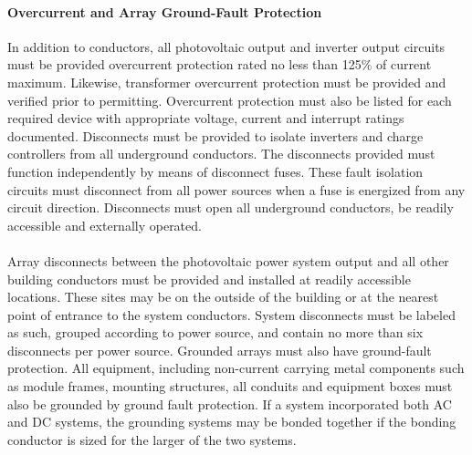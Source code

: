 \paragraph{Overcurrent and Array Ground-Fault Protection}
In addition to conductors, all photovoltaic output and inverter output circuits must be provided overcurrent protection rated no less than 125\% of current maximum. Likewise, transformer overcurrent protection must be provided and verified prior to permitting. Overcurrent protection must also be listed for each required device with appropriate voltage, current and interrupt ratings documented. Disconnects must be provided to isolate inverters and charge controllers from all underground conductors. The disconnects provided must function independently by means of disconnect fuses. These fault isolation circuits must disconnect from all power sources when a fuse is energized from any circuit direction. Disconnects must open all underground conductors, be readily accessible and externally operated.
\\\\
\noindent  Array disconnects between the photovoltaic power system output and all other building conductors must be provided and installed at readily accessible locations. These sites may be on the outside of the building or at the nearest point of entrance to the system conductors. System disconnects must be labeled as such, grouped according to power source, and contain no more than six disconnects per power source. Grounded arrays must also have ground-fault protection. All equipment, including non-current carrying metal components such as module frames, mounting structures, all conduits and equipment boxes must also be grounded by ground fault protection. If a system incorporated both AC and DC systems, the grounding systems may be bonded together if the bonding conductor is sized for the larger of the two systems.

